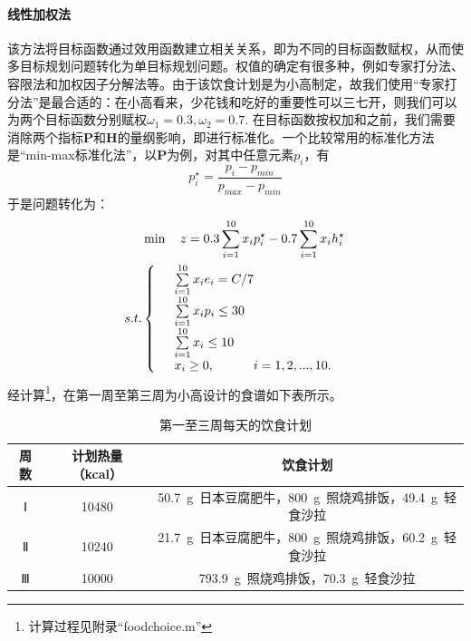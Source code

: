 \documentclass[a4paper,12pt,onecolumn,twoside]{article}
\begin{document}
\paragraph{线性加权法~}该方法将目标函数通过效用函数建立相关关系，即为不同的目标函数赋权，从而使多目标规划问题转化为单目标规划问题。权值的确定有很多种，例如专家打分法、容限法和加权因子分解法等。由于该饮食计划是为小高制定，故我们使用“专家打分法”是最合适的：在小高看来，少花钱和吃好的重要性可以三七开，则我们可以为两个目标函数分别赋权$\omega_{1}=0.3,\omega_{2}=0.7$. 在目标函数按权加和之前，我们需要消除两个指标\textbf{P}和\textbf{H}的量纲影响，即进行标准化。一个比较常用的标准化方法是“min-max标准化法”，以\textbf{P}为例，对其中任意元素$p_i$，有
\begin{equation}
	p_i^\star=\frac{p_i-p_{min}}{p_{max}-p_{min}}
\end{equation}
于是问题转化为：
\begin{align*}
	&\min \quad z= 0.3\sum_{i=1}^{10}  x_{i}p_{i}^\star-0.7\sum_{i=1}^{10}  x_{i}h_{i}^\star \\
	s.t.& \left\{ \begin{array}{r@{\quad}l@{}l@{\quad}l}
		& \sum\limits_{i=1}^{10} x_{i}e_{i}=C/7\\
		&\sum\limits_{i=1}^{10} x_{i}p_{i}\le 30\\
		&\sum\limits_{i=1}^{10} x_{i}\le 10\\
		& x_{i} \ge 0,  &i=1,2,...,10.
	\end{array}\right.
\end{align*}
经计算\footnote{计算过程见附录“foodchoice.m”}，在第一周至第三周为小高设计的食谱如下表所示。
\begin{table}[H]
	\centering
	\caption{第一至三周每天的饮食计划}
	\begin{tabular}{c|c|c} 
		\hline
		周数 & 计划热量（kcal） & 饮食计划  \\\hline
		Ⅰ & 10480 & 50.7~g~日本豆腐肥牛，800~g~照烧鸡排饭，49.4~g~轻食沙拉 \\\hline
		Ⅱ & 10240 & 21.7~g~日本豆腐肥牛，800~g~照烧鸡排饭，60.2~g~轻食沙拉 \\\hline
		Ⅲ & 10000 & 793.9~g~照烧鸡排饭，70.3~g~轻食沙拉 \\\hline
	\end{tabular}
\end{table}
\end{document}
